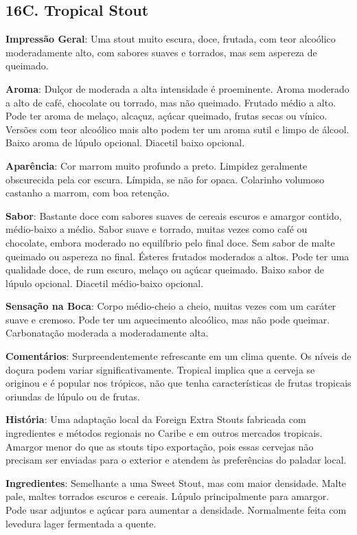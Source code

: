 \subsection*{16C. Tropical Stout}
\textbf{Impressão Geral}: Uma stout muito escura, doce, frutada, com teor alcoólico moderadamente alto, com sabores suaves e torrados, mas sem aspereza de queimado.

\textbf{Aroma}: Dulçor de moderada a alta intensidade é proeminente. Aroma moderado a alto de café, chocolate ou torrado, mas não queimado. Frutado médio a alto. Pode ter aroma de melaço, alcaçuz, açúcar queimado, frutas secas ou vínico. Versões com teor alcoólico mais alto podem ter um aroma sutil e limpo de álcool. Baixo aroma de lúpulo opcional. Diacetil baixo opcional.

\textbf{Aparência}: Cor marrom muito profundo a preto. Limpidez geralmente obscurecida pela cor escura. Límpida, se não for opaca. Colarinho volumoso castanho a marrom, com boa retenção.

\textbf{Sabor}: Bastante doce com sabores suaves de cereais escuros e amargor contido, médio-baixo a médio. Sabor suave e torrado, muitas vezes como café ou chocolate, embora moderado no equilíbrio pelo final doce. Sem sabor de malte queimado ou aspereza no final. Ésteres frutados moderados a altos. Pode ter uma qualidade doce, de rum escuro, melaço ou açúcar queimado. Baixo sabor de lúpulo opcional. Diacetil médio-baixo opcional.

\textbf{Sensação na Boca}: Corpo médio-cheio a cheio, muitas vezes com um caráter suave e cremoso. Pode ter um aquecimento alcoólico, mas não pode queimar. Carbonatação moderada a moderadamente alta.

\textbf{Comentários}: Surpreendentemente refrescante em um clima quente. Os níveis de doçura podem variar significativamente. Tropical implica que a cerveja se originou e é popular nos trópicos, não que tenha características de frutas tropicais oriundas de lúpulo ou de frutas.

\textbf{História}: Uma adaptação local da Foreign Extra Stouts fabricada com ingredientes e métodos regionais no Caribe e em outros mercados tropicais. Amargor menor do que as stouts tipo exportação, pois essas cervejas não precisam ser enviadas para o exterior e atendem às preferências do paladar local.

\textbf{Ingredientes}: Semelhante a uma Sweet Stout, mas com maior densidade. Malte pale, maltes torrados escuros e cereais. Lúpulo principalmente para amargor. Pode usar adjuntos e açúcar para aumentar a densidade. Normalmente feita com levedura lager fermentada a quente.

